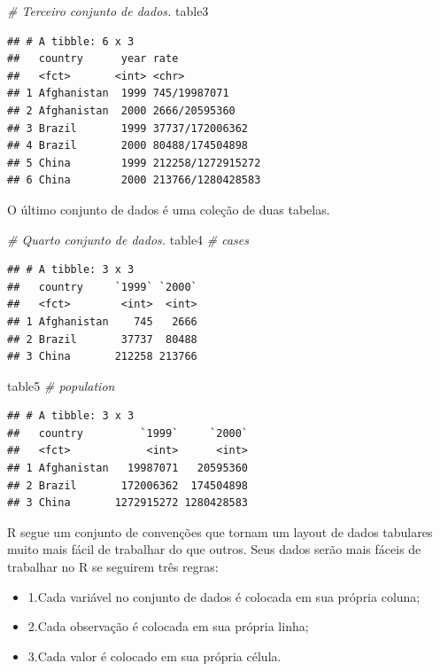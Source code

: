 \documentclass[a4paper]{book}
\newenvironment{Shaded}{\begin{snugshade}}{\end{snugshade}}
\newcommand{\CommentTok}[1]{\textcolor[rgb]{0.56,0.35,0.01}{\textit{#1}}}
\newcommand{\NormalTok}[1]{#1}
\providecommand{\tightlist}{%
  \setlength{\itemsep}{0pt}\setlength{\parskip}{0pt}}
\begin{document}
\begin{Shaded}
\begin{Highlighting}[]
\CommentTok{# Terceiro conjunto de dados.}
\NormalTok{table3}
\end{Highlighting}
\end{Shaded}

\begin{verbatim}
## # A tibble: 6 x 3
##   country      year rate             
##   <fct>       <int> <chr>            
## 1 Afghanistan  1999 745/19987071     
## 2 Afghanistan  2000 2666/20595360    
## 3 Brazil       1999 37737/172006362  
## 4 Brazil       2000 80488/174504898  
## 5 China        1999 212258/1272915272
## 6 China        2000 213766/1280428583
\end{verbatim}

O último conjunto de dados é uma coleção de duas tabelas.

\begin{Shaded}
\begin{Highlighting}[]
\CommentTok{# Quarto conjunto de dados.}
\NormalTok{table4 }\CommentTok{# cases}
\end{Highlighting}
\end{Shaded}

\begin{verbatim}
## # A tibble: 3 x 3
##   country     `1999` `2000`
##   <fct>        <int>  <int>
## 1 Afghanistan    745   2666
## 2 Brazil       37737  80488
## 3 China       212258 213766
\end{verbatim}

\begin{Shaded}
\begin{Highlighting}[]
\NormalTok{table5 }\CommentTok{# population}
\end{Highlighting}
\end{Shaded}

\begin{verbatim}
## # A tibble: 3 x 3
##   country         `1999`     `2000`
##   <fct>            <int>      <int>
## 1 Afghanistan   19987071   20595360
## 2 Brazil       172006362  174504898
## 3 China       1272915272 1280428583
\end{verbatim}

R segue um conjunto de convenções que tornam um layout de dados tabulares muito mais fácil de trabalhar do que outros. Seus dados serão mais fáceis de trabalhar no R se seguirem três regras:

\begin{itemize}
\tightlist
\item
  1.Cada variável no conjunto de dados é colocada em sua própria coluna;
\item
  2.Cada observação é colocada em sua própria linha;
\item
  3.Cada valor é colocado em sua própria célula.
\end{itemize}
\end{document}
